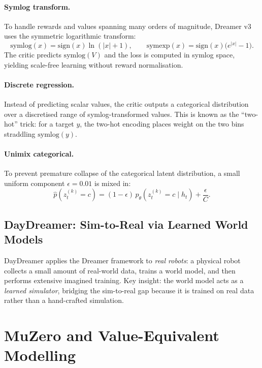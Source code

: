 \documentclass[11pt,a4paper]{article}
\theoremstyle{definition}
\begin{document}
\paragraph{Symlog transform.} To handle rewards and values spanning many
orders of magnitude, Dreamer v3 uses the symmetric logarithmic
transform:
\begin{equation}\label{eq:symlog}
  \mathrm{symlog}(x) = \mathrm{sign}(x)\ln(|x|+1),
  \qquad
  \mathrm{symexp}(x) = \mathrm{sign}(x)\big(e^{|x|}-1\big).
\end{equation}
The critic predicts $\mathrm{symlog}(V)$ and the loss is computed in
symlog space, yielding scale-free learning without reward normalisation.

\paragraph{Discrete regression.} Instead of predicting scalar values,
the critic outputs a categorical distribution over a discretised range
of symlog-transformed values. This is known as the ``two-hot'' trick:
for a target $y$, the two-hot encoding places weight on the two
bins straddling $\mathrm{symlog}(y)$.

\paragraph{Unimix categorical.} To prevent premature collapse of the
categorical latent distribution, a small uniform component
$\epsilon = 0.01$ is mixed in:
\begin{equation}
  \hat{p}(z_t^{(k)} = c) = (1 - \epsilon)\,p_\theta(z_t^{(k)} = c \mid h_t)
    + \frac{\epsilon}{C}.
\end{equation}

\subsection{DayDreamer: Sim-to-Real via Learned World Models}

DayDreamer \cite{wu2023daydreamer} applies the Dreamer framework to
\emph{real robots}: a physical robot collects a small amount of
real-world data, trains a world model, and then performs extensive
imagined training. Key insight: the world model acts as a
\emph{learned simulator}, bridging the sim-to-real gap because it is
trained on real data rather than a hand-crafted simulation.

\section{MuZero and Value-Equivalent Modelling}\label{sec:muzero}
\end{document}
